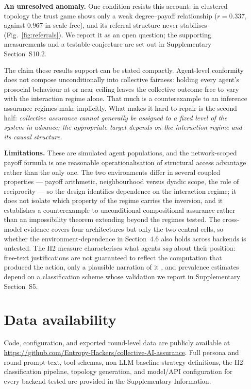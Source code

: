 \documentclass[11pt,a4paper]{article}
\begin{document}
\textbf{An unresolved anomaly.} One condition resists this account: in
clustered topology the trust game shows only a weak degree--payoff
relationship ($r=0.337$, against $0.967$ in scale-free), and its
referral structure never stabilises (Fig.~\ref{fig:referrals}). We
report it as an open question; the supporting measurements and a
testable conjecture are set out in Supplementary Section~S10.2.

The claim these results support can be stated compactly. Agent-level
conformity does not compose unconditionally into collective fairness:
holding every agent's prosocial behaviour at or near ceiling leaves
the collective outcome free to vary with the interaction regime alone.
That much is a counterexample to an inference assurance regimes make
implicitly. What makes it hard to repair is the second half:
\emph{collective assurance cannot generally be assigned to a fixed
level of the system in advance; the appropriate target depends on the
interaction regime and its causal structure.}

\textbf{Limitations.} These are simulated agent populations, and the
network-scoped payoff formula is one reasonable operationalisation of
structural access advantage rather than the only one. The two
environments differ in several coupled properties --- payoff
arithmetic, neighbourhood versus dyadic scope, the role of reciprocity
--- so the design identifies dependence on the interaction regime; it
does not isolate which property of the regime carries the inversion,
and it establishes a counterexample to unconditional compositional
assurance rather than an impossibility theorem extending beyond the
regimes tested. The cross-model
evidence covers four architectures but only the two central cells, so
whether the environment-dependence in Section~4.6 also holds across
backends is untested. The H2 measure characterises what agents
\emph{say} about their position: free-text justifications are not
guaranteed to reflect the computation that produced the action, only a
plausible narration of it \citep{Turpin:2023:Unfaithful}, and prevalence estimates
depend on a classification scheme whose validation we report in
Supplementary Section~S5.

\section*{Data availability}
Code, configuration, and exported round-level data are publicly
available at
\url{https://github.com/Entropy-Hackers/collective-AI-assurance}.
Full persona and round-prompt text, tool
schemas, non-LLM baseline strategy definitions, the H2 classification
pipeline, topology generation, and model/API configuration for every
backend tested are provided in the Supplementary Information.
\end{document}
